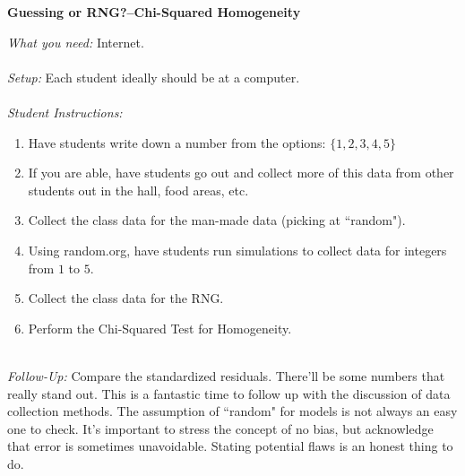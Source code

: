 \documentclass[12pt]{amsart}
\theoremstyle{definition}
\begin{document}
      \begin{framed}
      	\begin{center} \textbf{Guessing or RNG?--Chi-Squared Homogeneity} \end{center}
      	\emph{What you need:} Internet.\\
      	~\\
      	\emph{Setup:} Each student ideally should be at a computer.\\
      	~\\
      	\emph{Student Instructions:} 
      	\begin{enumerate}
      		\item Have students write down a number from the options: $\{1,2,3,4,5\}$
      		\item If you are able, have students go out and collect more of this data from other students out in the hall, food areas, etc.
      		\item Collect the class data for the man-made data (picking at ``random").
      		\item Using random.org, have students run simulations to collect data for integers from $1$ to $5$.
      		\item Collect the class data for the RNG.
      		\item Perform the Chi-Squared Test for Homogeneity.
      	\end{enumerate}
      	~\\
      	\emph{Follow-Up:} Compare the standardized residuals. There'll be some numbers that really stand out. This is a fantastic time to follow up with the discussion of data collection methods. The assumption of ``random" for models is not always an easy one to check. It's important to stress the concept of no bias, but acknowledge that error is sometimes unavoidable. Stating potential flaws is an honest thing to do.
      \end{framed}
      \newpage
      
\end{document}
